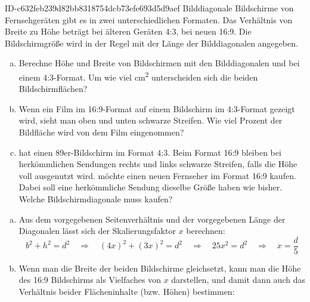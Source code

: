 \begin{exercise}
      {ID-c632feb239d82bb8318754dcb73efe693d5d9aef}
      {Bilddiagonale}
  \ifproblem\problem
    Bildschirme von Fernsehgeräten gibt es in zwei unterschiedlichen Formaten.
    Das Verhältnis von Breite zu Höhe beträgt bei älteren Geräten 4:3, bei
    neuen 16:9. Die Bildschirmgröße wird in der Regel mit der Länge der
    Bilddiagonalen angegeben.
    \begin{enumerate}[a)]
      \item Berechne Höhe und Breite von Bildschirmen mit den Bilddiagonalen
             und  bei einem 4:3-Format. Um wie viel cm\textsuperscript{2}
            unterscheiden sich die beiden Bildschirmflächen?
      \item Wenn ein Film im 16:9-Format auf einem Bildschirm im 4:3-Format gezeigt
            wird, sieht man oben und unten schwarze Streifen. Wie viel Prozent der
            Bildfläche wird von dem Film eingenommen?
      \item \xxa{} hat einen \num{89}er-Bildschirm im Format 4:3. Beim Format 16:9 bleiben
            bei herkömmlichen Sendungen rechts und links schwarze Streifen, falls die Höhe
            voll ausgenutzt wird. \xxa{} möchte einen neuen Fernseher im Format
            16:9 kaufen. Dabei soll eine herkömmliche Sendung dieselbe Größe haben
            wie bisher. Welche Bildschirmdiagonale muss \xxa{} kaufen?
    \end{enumerate}
  \fi
  \ifoutline\outline
    \begin{enumerate}[a)]
      \item Aus dem vorgegebenen Seitenverhältnis und der vorgegebenen Länge
            der Diagonalen lässt sich der Skalierungsfaktor $x$ berechnen:
            \begin{equation*}
              b^2+h^2=d^2
              \quad\Rightarrow\quad
              (4x)^2+(3x)^2=d^2
              \quad\Rightarrow\quad
              25x^2=d^2
              \quad\Rightarrow\quad
              x = \frac{d}{5}
            \end{equation*}
      \item Wenn man die Breite der beiden Bildschirme gleichsetzt, kann man
            die Höhe des 16:9 Bildschirms als Vielfaches von $x$ darstellen, und
            damit dann auch das Verhältnis beider Flächeninhalte (bzw. Höhen) bestimmen:\par
            \begin{minipage}{6.25cm}
              \begin{tikzpicture}

\end{tikzpicture}
\end{minipage}
\end{enumerate}
\end{exercise}
